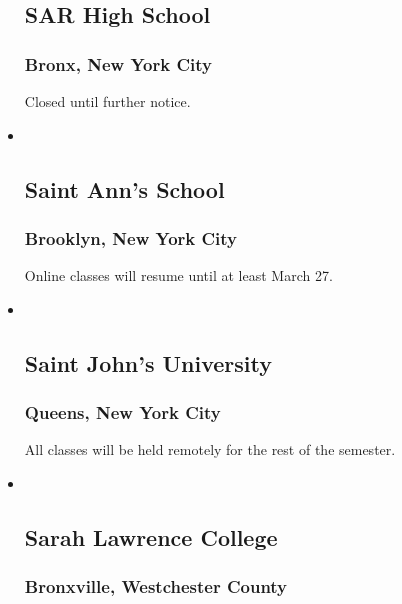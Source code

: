 \begin{itemize}
{  \subsection{SAR High School}\label{sar-high-school}}

  \hypertarget{bronx-new-york-city-5}{%
  \subsubsection{Bronx, New York City}\label{bronx-new-york-city-5}}

  Closed until further notice.
\item ~
  \hypertarget{saint-anns-school}{%
  \subsection{Saint Ann's School}\label{saint-anns-school}}

  \hypertarget{brooklyn-new-york-city-2}{%
  \subsubsection{Brooklyn, New York
  City}\label{brooklyn-new-york-city-2}}

  Online classes will resume until at least March 27.
\item ~
  \hypertarget{saint-johns-university}{%
  \subsection{Saint John's University}\label{saint-johns-university}}

  \hypertarget{queens-new-york-city-1}{%
  \subsubsection{Queens, New York City}\label{queens-new-york-city-1}}

  All classes will be held remotely for the rest of the semester.
\item ~
  \hypertarget{sarah-lawrence-college}{%
  \subsection{Sarah Lawrence College}\label{sarah-lawrence-college}}

  \hypertarget{bronxville-westchester-county}{%
  \subsubsection{Bronxville, Westchester
  County}\label{bronxville-westchester-county}}


\end{itemize}
